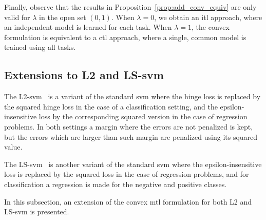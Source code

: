 Finally, observe that the results in Proposition~\ref{prop:add_conv_equiv} are only valid for $\lambda$ in the open set $(0, 1)$. 
When $\lambda=0$, we obtain an \acrshort{itl} approach, where an independent model is learned for each task. When $\lambda=1$, the convex formulation is equivalent to a \acrshort{ctl} approach, where a single, common model is trained using all tasks.



\subsection{Extensions to L2 and LS-\acrshort{svm}}\label{subsec:cvx_l2ls-svm}
The L2-\acrshort{svm}~\citep{Burges98} is a variant of the standard \acrshort{svm} where the hinge loss is replaced by the squared hinge loss in the case of a classification setting, and the epsilon-insensitive loss by the corresponding squared version in the case of regression problems. In both settings a margin where the errors are not penalized is kept, but the errors which are larger than such margin are penalized using its squared value.

The LS-\acrshort{svm}~\citep{SuykensV99} is another variant of the standard \acrshort{svm} where the epsilon-insensitive loss is replaced by the squared loss in the case of regression problems, and for classification a regression is made for the  negative and positive classes.

In this subsection, an extension of the convex \acrshort{mtl} formulation for both L2 and LS-\acrshort{svm} is presented.

